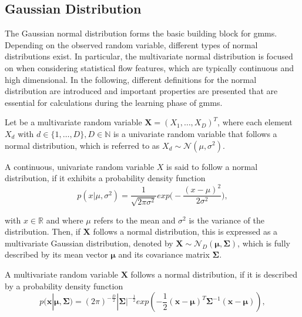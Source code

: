 \subsection{Gaussian Distribution}

The Gaussian normal distribution forms the basic building block for \acrshort{gmm}s. Depending on the observed random variable, different types of normal distributions exist. In particular, the multivariate normal distribution is focused on when considering statistical flow features, which are typically continuous and high dimensional. In the following, different definitions for the normal distribution are introduced and important properties are presented that are essential for calculations during the learning phase of \acrshort{gmm}s.

Let be a multivariate random variable $\bm{X} = (X_1, \dots, X_D)^T$, where each element $X_d$ with $d \in \{1, \dots, D\}, D \in \mathbb{N}$ is a univariate random variable that follows a normal distribution, which is referred to as $X_d \sim \mathcal{N}(\mu, \sigma^2)$.

\begin{definition} \cite[p. 175]{dei_2020}
A continuous, univariate random variable $X$ is said to follow a normal distribution, if it exhibits a probability density function
\begin{equation*}
p(x | \mu, \sigma^2) = \frac{1}{\sqrt{2\pi \sigma^2}} exp\bigg(- \frac{(x-\mu)^2}{2\sigma^2}\bigg),
\end{equation*}
\end{definition}

with $x \in \mathbb{R}$ and where $\mu$ refers to the mean and $\sigma^2$ is the variance of the distribution. Then, if $\bm{X}$ follows a normal distribution, this is expressed as a multivariate Gaussian distribution, denoted by $\bm{X} \sim \mathcal{N}_D(\bm{\mu}, \bm{\Sigma})$, which is fully described by its mean vector $\bm{\mu}$ and its covariance matrix $\bm{\Sigma}$.

\begin{definition}\label{def:multivariate_pdf} \cite[175]{dei_2020}
A multivariate random variable $\bm{X}$ follows a normal distribution, if it is described by a probability density function
\begin{equation*}
    p(\bm{x} | \bm{\mu}, \bm{\Sigma}) = (2\pi)^{-\frac{D}{2}} |\bm{\Sigma}|^{-\frac{1}{2}}exp\left(-\frac{1}{2}(\bm{x}-\bm{\mu})^T \bm{\Sigma}^{-1}(\bm{x}-\bm{\mu})\right),
\end{equation*}
\end{definition}

